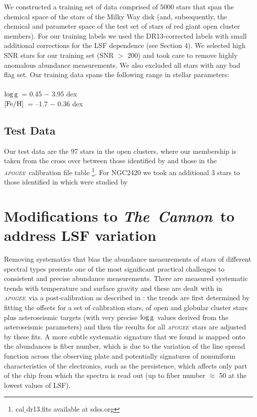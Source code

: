 \documentclass[14pt, preprint2]{aastex6}
\newcommand{\project}[1]{\textsl{#1}}
\newcommand{\tc}{\project{The~Cannon}}
\newcommand{\apogee}{\project{\textsc{apogee}}}
\newcommand{\teff}{\mbox{$\rm T_{eff}$}}
\newcommand{\feh}{\mbox{$\rm [Fe/H]$}}
\newcommand{\logg}{\mbox{$\rm \log g$}}
\begin{document}
We constructed a training set of data comprised of 5000 stars that span the chemical space of the stars of the Milky Way disk (and, subsequently, the chemical and parameter space of the  test set of stars of red giant open cluster members).  For our training labels we used the DR13-corrected labels with small additional corrections for the LSF dependence (see Section 4). We selected high SNR stars for our training set (SNR $>$ 200) and took care to remove highly anomalous abundance measurements. We also excluded all stars with any bad flag set.  Our training data spans the following range in stellar parameters:\\

\noindent{\teff\ = 3650 $-$ 5760 K } \\
\logg\ = 0.45 $-$ 3.95 dex \\
\feh\ = --1.7 $-$ 0.36 dex \\

\subsection{Test Data} 

Our test data are the 97 stars in the open clusters, where our membership is taken from the cross over between those identified by \citet{Meszaros2013} and those in the \apogee\ calibration file table \footnote{cal$\_$dr13.fits available at sdss.org}. For NGC2420 we took an additional 3 stars to those identified in \citet{Meszaros2013}  which were studied by \citet{Souto2016}

\section{Modifications to \tc\ to address LSF variation}

Removing systematics that bias the abundance measurements of stars of different spectral types presents one of the most significant practical challenges to consistent and precise abundance measurements. There are measured systematic trends with temperature and surface gravity and these are dealt with in \apogee\ via a post-calibration as described in \citet{Holtzman2015}: the trends are first determined by fitting the offsets for a set of calibration stars, of open and globular cluster stars plus asteroseismic targets (with very precise \logg\ values derived from the asteroseismic parameters) and then the results for all \apogee\ stars are adjusted by these fits.  A more subtle systematic signature that we found is mapped onto the abundances is fiber number, which is due to the variation of the line spread function across the observing plate and potentially signatures of nonuniform characteristics of the electronics, such as the persistence, which affects only part of the chip from which the spectra is read out (up to fiber number $\approx$ 50 at the lowest values of LSF). 
\end{document}
